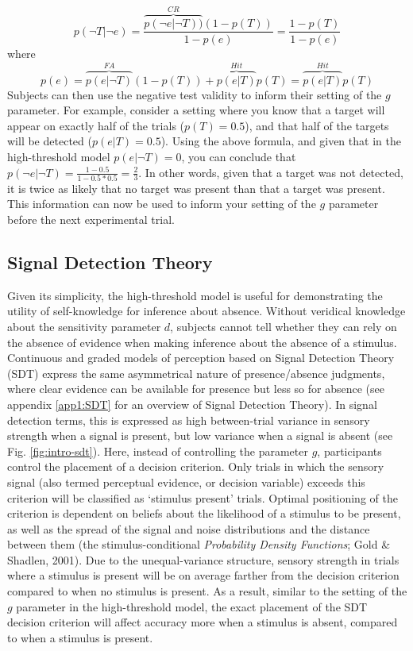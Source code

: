 \documentclass[12pt,twoside]{reedthesis}
\begin{document}
\begin{equation}
p(\neg T|\neg e)=\frac{\overbrace{p(\neg e|\neg T))}^{CR}(1-p(T))}{1-p(e)} = \frac{1-p(T)}{1-p(e)}
\end{equation}
where
\begin{equation}
p(e)=\overbrace{p(e|\neg T)}^{FA}(1-p(T))+\overbrace{p(e|T)}^{Hit}p(T) = \overbrace{p(e|T)}^{Hit}p(T)
\end{equation}
Subjects can then use the negative test validity to inform their setting of the \(g\) parameter. For example, consider a setting where you know that a target will appear on exactly half of the trials (\(p(T)=0.5\)), and that half of the targets will be detected (\(p(e|T)=0.5\)). Using the above formula, and given that in the high-threshold model \(p(e|\neg T)=0\), you can conclude that \(p(\neg e|\neg T)=\frac{1-0.5}{1-0.5*0.5}=\frac{2}{3}\). In other words, given that a target was not detected, it is twice as likely that no target was present than that a target was present. This information can now be used to inform your setting of the \(g\) parameter before the next experimental trial.

\hypertarget{sdt}{%
\subsection*{Signal Detection Theory}\label{sdt}}

Given its simplicity, the high-threshold model is useful for demonstrating the utility of self-knowledge for inference about absence. Without veridical knowledge about the sensitivity parameter \(d\), subjects cannot tell whether they can rely on the absence of evidence when making inference about the absence of a stimulus. Continuous and graded models of perception based on Signal Detection Theory (SDT) express the same asymmetrical nature of presence/absence judgments, where clear evidence can be available for presence but less so for absence (see appendix \ref{app1:SDT} for an overview of Signal Detection Theory). In signal detection terms, this is expressed as high between-trial variance in sensory strength when a signal is present, but low variance when a signal is absent (see Fig. \ref{fig:intro-sdt}). Here, instead of controlling the parameter \(g\), participants control the placement of a decision criterion. Only trials in which the sensory signal (also termed perceptual evidence, or decision variable) exceeds this criterion will be classified as `stimulus present' trials. Optimal positioning of the criterion is dependent on beliefs about the likelihood of a stimulus to be present, as well as the spread of the signal and noise distributions and the distance between them (the stimulus-conditional \emph{Probability Density Functions}; Gold \& Shadlen, 2001). Due to the unequal-variance structure, sensory strength in trials where a stimulus is present will be on average farther from the decision criterion compared to when no stimulus is present. As a result, similar to the setting of the \(g\) parameter in the high-threshold model, the exact placement of the SDT decision criterion will affect accuracy more when a stimulus is absent, compared to when a stimulus is present.
\end{document}
